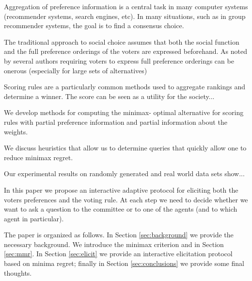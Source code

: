 \documentclass[12pt]{article}
\begin{document}
Aggregation of preference information is a central task in many computer systems (recommender systems, search engines, etc).
In many situations, such as in group recommender systems, the goal is to find a consensus choice.

The traditional approach to social choice assumes that both the social function and the full preference orderings of the voters are expressed beforehand. 
As noted by several authors requiring voters to express full preference orderings can be onerous (especially for large sets of alternatives) 

Scoring rules are a particularly common methods used to aggregate rankings and determine  a winner.
The score can be seen as a utility for the society...

We develop methods for computing the minimax- optimal alternative for scoring rules with partial preference information and partial information about the weights.

We discuss  heuristics that allow us to determine queries that quickly allow one to reduce minimax regret.


 Our experimental results on randomly generated and real world data sets show...

In this paper we propose an interactive adaptive protocol for eliciting both the voters preferences and the voting rule.
At each step we need to decide whether we want to ask a question to the committee or to one of the agents (and to which agent in particular).

\medskip
The paper is organized as follows.
In Section \ref{sec:background} we provide the necessary background.
We introduce the minimax criterion and in Section \ref{sec:mmr}.
In Section \ref{sec:elicit} we provide an interactive elicitation protocol based on minima regret; finally in Section 
\ref{sec:conclusions} we provide some final thoughts.
\end{document}

